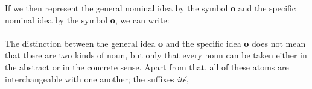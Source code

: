 \begin{sloppypar}
{  If we then represent the general nominal idea by the symbol
  \textbf{o} and the specific nominal idea by the symbol
  \textbf{o}, we can write:\\[1ex]

  \\[1ex]

  The distinction between the general idea \textbf{o} and the specific
  idea \textbf{o} does not mean that there are two kinds of
  noun, but only that every noun can be taken either in the abstract
  or in the concrete sense. Apart from that, all of these atoms are
  interchangeable with one another; the suffixes \emph{ité}, }


\end{sloppypar}
